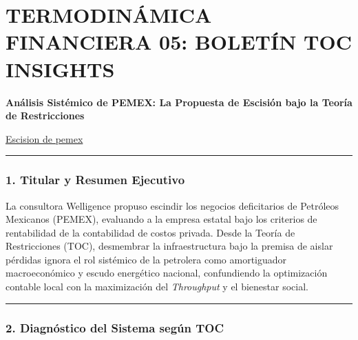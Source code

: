 \documentclass[12pt,letterpaper]{article}
\begin{document}
\hypertarget{termodinuxe1mica-financiera-05-boletuxedn-toc-insights}{%
\section{TERMODINÁMICA FINANCIERA 05: BOLETÍN TOC
INSIGHTS}\label{termodinuxe1mica-financiera-05-boletuxedn-toc-insights}}

\textbf{Análisis Sistémico de PEMEX: La Propuesta de Escisión bajo la
Teoría de Restricciones}

\href{https://es-us.noticias.yahoo.com/proponen-escindir-pemex-negocios-deficitarios-050356273.html}{Escision
de pemex}

\begin{center}\rule{0.5\linewidth}{0.5pt}\end{center}

\hypertarget{titular-y-resumen-ejecutivo}{%
\subsubsection{1. Titular y Resumen
Ejecutivo}\label{titular-y-resumen-ejecutivo}}

La consultora Welligence propuso escindir los negocios deficitarios de
Petróleos Mexicanos (PEMEX), evaluando a la empresa estatal bajo los
criterios de rentabilidad de la contabilidad de costos privada. Desde la
Teoría de Restricciones (TOC), desmembrar la infraestructura bajo la
premisa de aislar pérdidas ignora el rol sistémico de la petrolera como
amortiguador macroeconómico y escudo energético nacional, confundiendo
la optimización contable local con la maximización del \emph{Throughput}
y el bienestar social.

\begin{center}\rule{0.5\linewidth}{0.5pt}\end{center}

\hypertarget{diagnuxf3stico-del-sistema-seguxfan-toc}{%
\subsubsection{2. Diagnóstico del Sistema según
TOC}\label{diagnuxf3stico-del-sistema-seguxfan-toc}}
\end{document}
